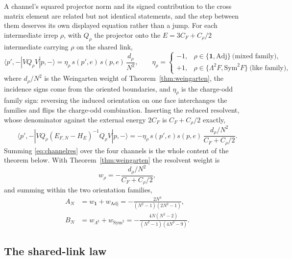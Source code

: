 \documentclass[11pt]{article}
\theoremstyle{plain}
\theoremstyle{definition}
\theoremstyle{remark}
\newcommand{\chk}[1]{}
\newcommand{\CF}{C_F}
\begin{document}
A channel's squared projector norm and its signed contribution to the cross
matrix element are related but not identical statements, and the step between
them deserves its own displayed equation rather than a jump. For each
intermediate irrep $\rho$, with $Q_\rho$ the projector onto the
$E=3\CF+C_\rho/2$ intermediate carrying $\rho$ on the shared link,
\begin{equation}\label{eq:channelme}
  \langle p',-|VQ_\rho V|p,-\rangle
  =\eta_\rho\,s(p',e)\,s(p,e)\,\frac{d_\rho}{N^2},
  \qquad
  \eta_\rho=
  \begin{cases}
    -1,&\rho\in\{\mathbf1,\mathrm{Adj}\}\ \text{(mixed family)},\\
    +1,&\rho\in\{\Lambda^2F,\mathrm{Sym}^2F\}\ \text{(like family)},
  \end{cases}
\end{equation}
where $d_\rho/N^2$ is the Weingarten weight of
Theorem~\ref{thm:weingarten}, the incidence signs come from the oriented
boundaries, and $\eta_\rho$ is the charge-odd family sign: reversing the
induced orientation on one face interchanges the families and flips the
charge-odd combination. Inserting the reduced resolvent, whose denominator
against the external energy $2\CF$ is $\CF+C_\rho/2$ exactly,
\begin{equation}\label{eq:channelres}
  \langle p',-|VQ_\rho(E_{F,N}-H_E)^{-1}Q_\rho V|p,-\rangle
  =-\eta_\rho\,s(p',e)s(p,e)\,\frac{d_\rho/N^2}{\CF+C_\rho/2}.
\end{equation}
Summing \eqref{eq:channelres} over the four channels is the whole content of
the theorem below. With Theorem~\ref{thm:weingarten} the resolvent weight is
\begin{equation}\label{eq:w}
  w_\rho=-\frac{d_\rho/N^2}{\CF+C_\rho/2},
\end{equation}
and summing within the two orientation families,
\begin{align}
  A_N&=w_{\mathbf 1}+w_{\mathrm{Adj}}=-\frac{2N^3}{(N^2-1)(2N^2-1)},\label{eq:AN}\\
  B_N&=w_{\Lambda^2}+w_{\mathrm{Sym}^2}=-\frac{4N(N^2-2)}{(N^2-1)(4N^2-9)}.\label{eq:BN}
\end{align}
\chk{the four channel weights follow from dimension and Casimir}
\chk{A\_N and B\_N are the channel sums, not transcriptions}

\subsection{The shared-link law}
\end{document}
